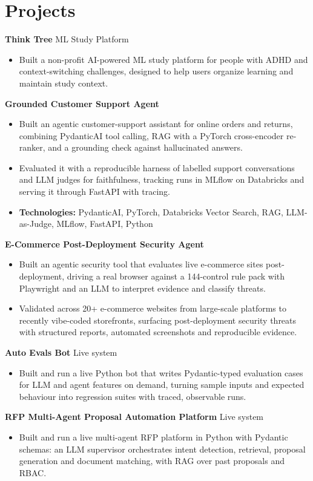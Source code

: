 \documentclass[10pt,a4paper]{article}
\begin{document}
\section{Projects}
\textbf{Think Tree} \textbar{} ML Study Platform\par
\begin{itemize}
  \item Built a non-profit AI-powered ML study platform for people with ADHD and context-switching challenges, designed to help users organize learning and maintain study context.
\end{itemize}
\textbf{Grounded Customer Support Agent}\par
\begin{itemize}
  \item Built an agentic customer-support assistant for online orders and returns, combining PydanticAI tool calling, RAG with a PyTorch cross-encoder re-ranker, and a grounding check against hallucinated answers.
  \item Evaluated it with a reproducible harness of labelled support conversations and LLM judges for faithfulness, tracking runs in MLflow on Databricks and serving it through FastAPI with tracing.
  \item \textbf{Technologies:} PydanticAI, PyTorch, Databricks Vector Search, RAG, LLM-as-Judge, MLflow, FastAPI, Python
\end{itemize}
\textbf{E-Commerce Post-Deployment Security Agent}\par
\begin{itemize}
  \item Built an agentic security tool that evaluates live e-commerce sites post-deployment, driving a real browser against a 144-control rule pack with Playwright and an LLM to interpret evidence and classify threats.
  \item Validated across 20+ e-commerce websites from large-scale platforms to recently vibe-coded storefronts, surfacing post-deployment security threats with structured reports, automated screenshots and reproducible evidence.
\end{itemize}
\textbf{Auto Evals Bot} \textbar{} Live system\par
\begin{itemize}
  \item Built and run a live Python bot that writes Pydantic-typed evaluation cases for LLM and agent features on demand, turning sample inputs and expected behaviour into regression suites with traced, observable runs.
\end{itemize}
\textbf{RFP Multi-Agent Proposal Automation Platform} \textbar{} Live system\par
\begin{itemize}
  \item Built and run a live multi-agent RFP platform in Python with Pydantic schemas: an LLM supervisor orchestrates intent detection, retrieval, proposal generation and document matching, with RAG over past proposals and RBAC.
\end{itemize}
\end{document}
